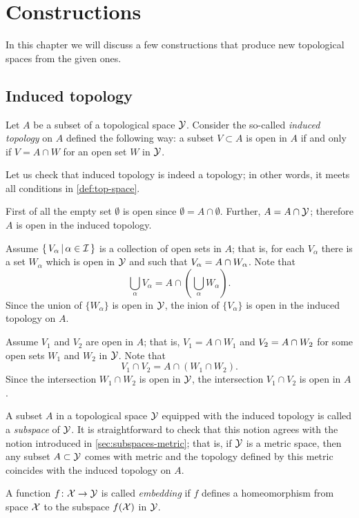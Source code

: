 \chapter{Constructions}

In this chapter we will discuss a few constructions that produce new topological spaces from the given ones.

\section{Induced topology}\label{sec:induced-topology}

Let $A$ be a subset of a topological space $\mathcal{Y}$.
Consider the so-called \emph{induced topology} on $A$ defined the following way:
a subset $V\subset A$ is open in $A$ if and only if $V=A\cap W$ for an open set $W$ in $\mathcal{Y}$.

Let us check that induced topology is indeed a topology;
in other words, it meets all conditions in \ref{def:top-space}.

First of all the empty set
$\emptyset$ is open since $\emptyset=A\cap \emptyset$.
Further, $A=A\cap \mathcal{Y}$;
therefore $A$ is open in the induced topology.

Assume $\left\{\,{V_\alpha}\,\middle|\,{\alpha\in\mathcal{I}}\,\right\}$ is a collection of open sets in $A$;
that is, for each $V_\alpha$ there is a set $W_\alpha$ which is open in $\mathcal{Y}$ and such that $V_\alpha\z=A\cap W_\alpha$.
Note that
\[\bigcup_\alpha V_\alpha=A\cap\left(\bigcup_\alpha W_\alpha\right).\]
Since the union of $\{W_\alpha\}$ is open in $\mathcal{Y}$, the inion of $\{V_\alpha\}$ is open in the induced topology on $A$.

Assume $V_1$ and $V_2$ are open in $A$; 
that is, $V_1=A\cap W_1$ and  $V_2\z=A\cap W_2$ for some open sets $W_1$ and $W_2$ in $\mathcal{Y}$.
Note that
\[V_1\cap V_2=A\cap(W_1\cap W_2).\]
Since the intersection $W_1\cap W_2$ is open in $\mathcal{Y}$,
the intersection $V_1\cap V_2$ is open in $A$.


A subset $A$ in a topological space $\mathcal{Y}$ equipped with the induced topology is called a \emph{subspace} of $\mathcal{Y}$.
It is straightforward to check that this notion agrees with the notion introduced in \ref{sec:subspaces-metric};
that is, if $\mathcal{Y}$ is a metric space, then any subset $A\subset\mathcal{Y}$ comes with metric
and the topology defined by this metric coincides with the induced topology on $A$.

A function $f\colon\mathcal{X}\to \mathcal{Y}$ is called \emph{embedding} if $f$ defines a homeomorphism from space $\mathcal{X}$ to the subspace $f(\mathcal{X})$ in $\mathcal{Y}$.

